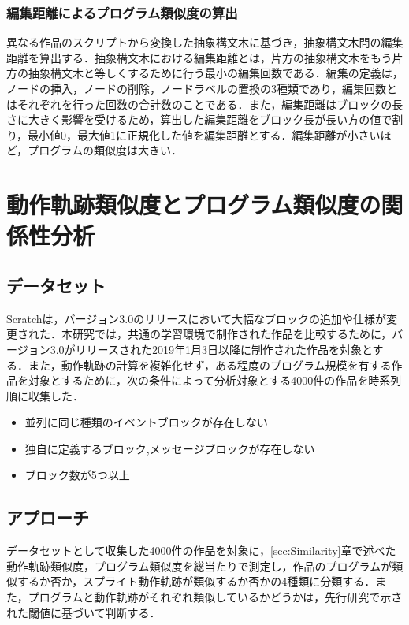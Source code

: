 \documentclass[T,J]{fose} %
\begin{document}
\subsubsection{編集距離によるプログラム類似度の算出}
異なる作品のスクリプトから変換した抽象構文木に基づき，抽象構文木間の編集距離を算出する．抽象構文木における編集距離とは，片方の抽象構文木をもう片方の抽象構文木と等しくするために行う最小の編集回数である．編集の定義は，ノードの挿入，ノードの削除，ノードラベルの置換の3種類であり，編集回数とはそれぞれを行った回数の合計数のことである．また，編集距離はブロックの長さに大きく影響を受けるため，算出した編集距離をブロック長が長い方の値で割り，最小値0，最大値1に正規化した値を編集距離とする．編集距離が小さいほど，プログラムの類似度は大きい．

\section{動作軌跡類似度とプログラム類似度の関係性分析}\label{sec:Analysis}

\subsection{データセット}
Scratchは，バージョン3.0のリリースにおいて大幅なブロックの追加や仕様が変更された．本研究では，共通の学習環境で制作された作品を比較するために，バージョン3.0がリリースされた2019年1月3日以降に制作された作品を対象とする．また，動作軌跡の計算を複雑化せず，ある程度のプログラム規模を有する作品を対象とするために，次の条件によって分析対象とする4000件の作品を時系列順に収集した．
\begin{itemize}
    \item 並列に同じ種類のイベントブロックが存在しない
    \item 独自に定義するブロック,メッセージブロックが存在しない
    \item ブロック数が5つ以上
\end{itemize}

\subsection{アプローチ}\label{subsec:approach}

データセットとして収集した4000件の作品を対象に，\ref{sec:Similarity}章で述べた動作軌跡類似度，プログラム類似度を総当たりで測定し，作品のプログラムが類似するか否か，スプライト動作軌跡が類似するか否かの4種類に分類する．また，プログラムと動作軌跡がそれぞれ類似しているかどうかは，先行研究で示された閾値に基づいて判断する．
\end{document}
